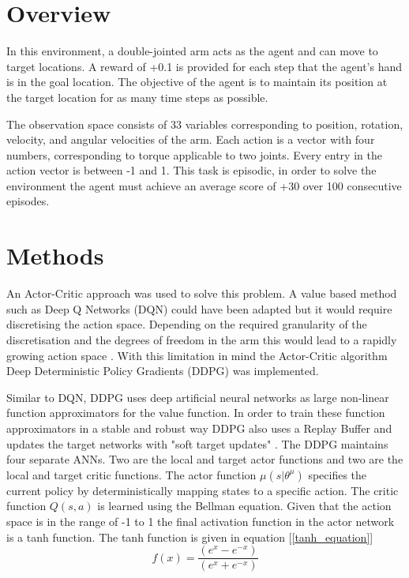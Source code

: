 \documentclass[12pt]{article}
\begin{document}
\maketitle


\section{Overview}
In this environment, a double-jointed arm acts as the agent and can move to target locations.
A reward of +0.1 is provided for each step that the agent's hand is in the goal location. 
The objective of the agent is to maintain its position at the target location for as many time steps as possible.

The observation space consists of 33 variables corresponding to position, rotation, velocity, and angular velocities of the arm. 
Each action is a vector with four numbers, corresponding to torque applicable to two joints. 
Every entry in the action vector is between -1 and 1.
This task is episodic, in order to solve the environment the agent must achieve an average score of +30 over 100 consecutive episodes.

\section{Methods}
\label{methods}
An Actor-Critic approach was used to solve this problem.
A value based method such as Deep Q Networks (DQN) \cite{dqn_paper} could have been adapted but it would require discretising the action space. 
Depending on the required granularity of the discretisation and the degrees of freedom in the arm this would lead to a rapidly growing action space \cite{curse_of_dimensionality}.
With this limitation in mind the Actor-Critic algorithm Deep Deterministic Policy Gradients (DDPG)\cite{ddpg_paper} was implemented.

Similar to DQN, DDPG uses deep artificial neural networks as large non-linear function approximators for the value function.
In order to train these function approximators in a stable and robust way DDPG also uses a Replay Buffer\cite{experience_replay} and updates the target networks with "soft target updates" \cite{ddpg_paper}.
The DDPG maintains four separate ANNs.
Two are the local and target actor functions and two are the local and target critic functions.
The actor function $\mu(s|\theta^{\mu})$ specifies the current policy by deterministically mapping states to a specific action.
The critic function $Q(s,a)$ is learned using the Bellman equation.
Given that the action space is in the range of -1 to 1 the final activation function in the actor network is a tanh function.
The tanh function is given in equation [\ref{tanh_equation}]
\begin{equation}
\label{tanh_equation}
f(x) = \frac{(e^x - e^{-x})}{(e^x+e^{-x})}
\end{equation}
\end{document}
